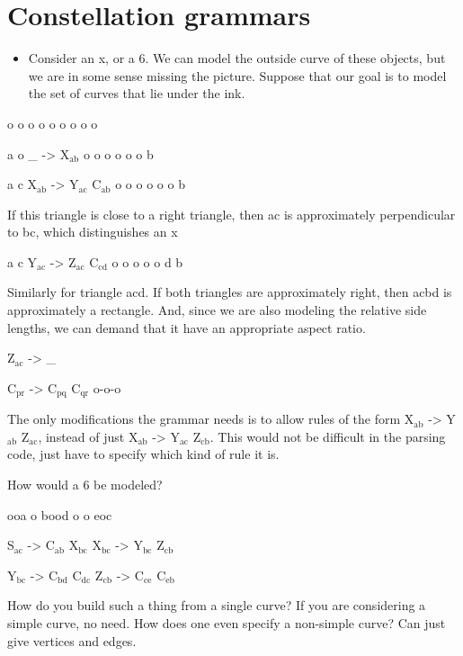 \documentclass{book}
\begin{document}
\section{Constellation grammars}
\label{sec-4_8}

\begin{itemize}
\item Consider an x, or a 6. We can model the outside curve of these
    objects, but we are in some sense missing the picture. Suppose
    that our goal is to model the set of curves that lie under the
    ink.
\end{itemize}

o   o
 o o
  o
 o o
o   o

a   o  \_{} -> X$_{\mathrm{ab}}$
 o o
  o
 o o
o   b

a   c  X$_{\mathrm{ab}}$ -> Y$_{\mathrm{ac}}$ C$_{\mathrm{ab}}$
 o o
  o
 o o
o   b

If this triangle is close to a right triangle, then ac is
approximately perpendicular to bc, which distinguishes an x

a   c  Y$_{\mathrm{ac}}$ -> Z$_{\mathrm{ac}}$ C$_{\mathrm{cd}}$
 o o
  o
 o o
d   b

Similarly for triangle acd. If both triangles are approximately right,
then acbd is approximately a rectangle. And, since we are also
modeling the relative side lengths, we can demand that it have an
appropriate aspect ratio.

Z$_{\mathrm{ac}}$ -> \_{}

C$_{\mathrm{pr}}$ -> C$_{\mathrm{pq}}$ C$_{\mathrm{qr}}$
o-o-o

The only modifications the grammar needs is to allow rules of the form
X$_{\mathrm{ab}}$ -> Y$_{\mathrm{ab}}$ Z$_{\mathrm{ac}}$, instead of just X$_{\mathrm{ab}}$ -> Y$_{\mathrm{ac}}$ Z$_{\mathrm{cb}}$. This would not
be difficult in the parsing code, just have to specify which kind of
rule it is.

How would a 6 be modeled?

  ooa
 o   
 bood
 o   o
  eoc

S$_{\mathrm{ac}}$ -> C$_{\mathrm{ab}}$ X$_{\mathrm{bc}}$
X$_{\mathrm{bc}}$ -> Y$_{\mathrm{bc}}$ Z$_{\mathrm{cb}}$

Y$_{\mathrm{bc}}$ -> C$_{\mathrm{bd}}$ C$_{\mathrm{dc}}$
Z$_{\mathrm{cb}}$ -> C$_{\mathrm{ce}}$ C$_{\mathrm{eb}}$

How do you build such a thing from a single curve? If you are
considering a simple curve, no need. How does one even specify a
non-simple curve? Can just give vertices and edges.
\end{document}
